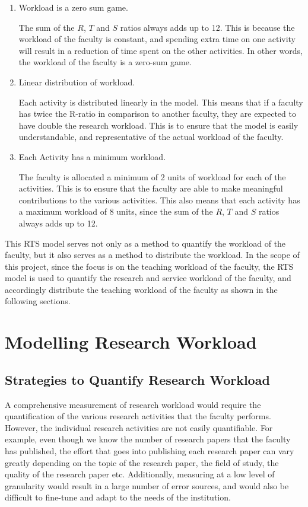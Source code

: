 \begin{enumerate}
  \item Workload is a zero sum game.

        The sum of the $R$, $T$ and $S$ ratios always adds up to 12. This is because the workload of the faculty is constant, and spending extra time on one activity will result in a reduction of time spent on the other activities. In other words, the workload of the faculty is a zero-sum game.

  \item Linear distribution of workload.

        Each activity is distributed linearly in the model. This means that if a faculty has twice the R-ratio in comparison to another faculty, they are expected to have double the research workload. This is to ensure that the model is easily understandable, and representative of the actual workload of the faculty.

  \item Each Activity has a minimum workload.

        The faculty is allocated a minimum of 2 units of workload for each of the activities. This is to ensure that the faculty are able to make meaningful contributions to the various activities. This also means that each activity has a maximum workload of 8 units, since the sum of the $R$, $T$ and $S$ ratios always adds up to 12.

\end{enumerate}

This RTS model serves not only as a method to quantify the workload of the faculty, but it also serves as a method to distribute the workload. In the scope of this project, since the focus is on the teaching workload of the faculty, the RTS model is used to quantify the research and service workload of the faculty, and accordingly distribute the teaching workload of the faculty as shown in the following sections.


\section{Modelling Research Workload}
\label{sec:modelling_research_workload}

\subsection{Strategies to Quantify Research Workload}

A comprehensive measurement of research workload would require the quantification of the various research activities that the faculty performs. However, the individual research activities are not easily quantifiable. For example, even though we know the number of research papers that the faculty has published, the effort that goes into publishing each research paper can vary greatly depending on the topic of the research paper, the field of study, the quality of the research paper etc. Additionally, measuring at a low level of granularity would result in a large number of error sources, and would also be difficult to fine-tune and adapt to the needs of the institution.

